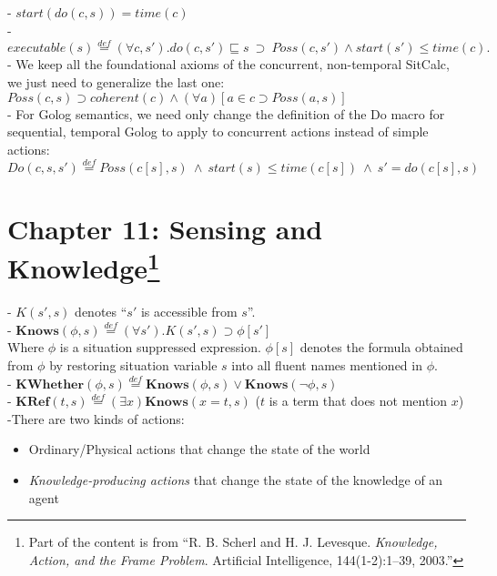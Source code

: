 \documentclass[fleqn]{report}
\begin{document}
- $start(do(c,s))=time(c)$\\

- $executable(s) \stackrel{def}{=} (\forall c,s').do(c,s')\sqsubseteq s \ \supset \ Poss(c,s')\land start(s')\leq time(c).$\\

- We keep all the foundational axioms of the concurrent, non-temporal SitCalc, we just need to generalize the last one: $Poss(c,s)\supset coherent(c) \land (\forall a)[a\in c\supset Poss(a,s)]$\\

- For Golog semantics, we need only change the definition of the Do macro for sequential, temporal Golog to apply to concurrent actions instead of simple actions:
\vspace{-.3cm}
\[Do(c,s,s')\stackrel{def}{=}Poss(c[s],s) \ \land \ start(s)\leq time(c[s]) \ \land \ s'=do(c[s],s)\]

\newpage
\section*{Chapter 11: Sensing and Knowledge\footnote{Part of the content is from ``R. B. Scherl and H. J. Levesque. \emph{Knowledge, Action, and the Frame Problem}. Artificial Intelligence, 144(1-2):1–39, 2003.''}}
- $K(s',s)$ denotes ``$s'$ is accessible from $s$''.\\

- $\textbf{Knows}(\phi,s)\stackrel{def}{=}(\forall s'). K(s',s) \supset \phi[s']$\\
Where $\phi$ is a situation suppressed expression. $\phi[s]$ denotes the formula obtained from $\phi$ by restoring situation variable $s$ into all fluent names mentioned in $\phi$.\\

- $\textbf{KWhether}(\phi,s)\stackrel{def}{=}\textbf{Knows}(\phi,s)\lor\textbf{Knows}(\neg\phi,s)$\\

- $\textbf{KRef}(t,s)\stackrel{def}{=}(\exists x)\textbf{Knows}(x=t,s)$ \qquad  \qquad ($t$ is a term that does not mention $x$)\\

-There are two kinds of actions:
\vspace{-.1cm} 
\begin{itemize}
\itemsep-.3em
 \item Ordinary/Physical actions that change the state of the world
 \item \emph{Knowledge-producing actions} that change the state of the knowledge of an agent
\end{itemize}
\end{document}
